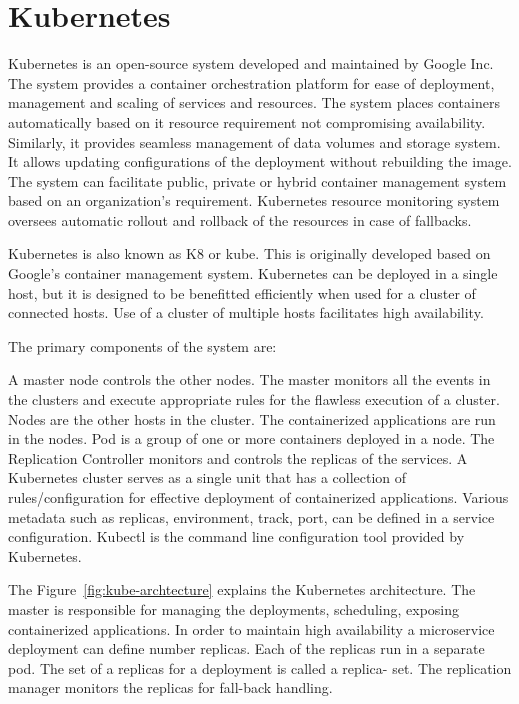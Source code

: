 \section{Kubernetes}

Kubernetes is an open-source system developed and maintained by Google Inc.
The system provides a container orchestration platform for ease of deployment,
management and scaling of services and resources. The system places containers
automatically based on it resource requirement not compromising availability.
Similarly, it provides seamless management of data volumes and storage system.
It allows updating configurations of the deployment without rebuilding the
image. The system can facilitate public, private or hybrid container
management system based on an organization's requirement.  Kubernetes resource
monitoring system oversees automatic rollout and rollback of the resources in
case of fallbacks.


Kubernetes is also known as K8 or kube. This is originally developed based on
Google's container management system. Kubernetes can be deployed in a single
host, but it is designed to be benefitted efficiently when used for a cluster
of connected hosts. Use of a cluster of multiple hosts facilitates high
availability.

The primary components of the system are: 

A master node controls the other nodes. The master monitors all the events in
the clusters and execute appropriate  rules for the flawless execution of a
cluster.  Nodes are the other hosts in the cluster. The containerized
applications are run in the nodes. Pod is a group of one or more containers
deployed in a node. The Replication Controller monitors and controls the
replicas of the services. A Kubernetes cluster serves as a single unit that
has a collection of rules/configuration for effective deployment of
containerized applications. Various metadata such as replicas, environment,
track, port, can be defined in a service configuration.  Kubectl is the
command line configuration tool provided by Kubernetes.

The Figure~\ref{fig:kube-archtecture} explains the Kubernetes architecture.
The master is responsible for managing the deployments, scheduling, exposing
containerized applications. In order to maintain high availability a
microservice deployment can define number replicas. Each of the replicas run
in a separate pod. The set of a replicas for a deployment is called a replica-
set. The replication manager monitors the replicas for fall-back handling.

